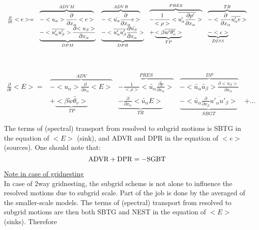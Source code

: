 \begin{displaymath}
\begin{array}{rllll}
\frac{\partial }{\partial t} <e> = & 
\overbrace{- <u_\alpha>\frac{\partial}{\partial x_\alpha} <e> }^{ADVM} &
\overbrace{- <\tilde{u_\alpha}\frac{\partial}{\partial x_\alpha} e > }^{ADVR} &
\overbrace{- \frac{1}{<\rho>}<\overline{u'_\alpha \frac{\partial p'}{\partial x_\alpha}}>}^{PRES} &
\overbrace{- <\frac{\partial}{\partial x_\alpha} \overline{u'_\alpha e}>}^{TR}\\
\vspace*{1.2cm}
&\underbrace{- <\overline{u'_\alpha u'_\beta}> \frac{\partial {<u_\beta>}}{\partial x_\alpha}}_{DPM} &
\underbrace{- <\overline{u'_\alpha u'_\beta} \frac{\partial {\tilde{u_\beta}}}{\partial x_\alpha}>}_{DPR} &
+ \underbrace{<\beta  \overline{w'\theta'_v}>}_{TP} & 
\underbrace{- <\epsilon>}_{DISS}\\
\end{array}
\end{displaymath}
\begin{displaymath}
\begin{array}{rllll}
\frac{\partial }{\partial t} <E> = & 
\overbrace{- <u_\alpha>\frac{\partial}{\partial x_\alpha} <E> }^{ADV} &
\overbrace{- \frac{1}{<\rho>}<\tilde{u_\alpha} \frac{\partial \tilde{p}}{\partial x_\alpha}>}^{PRES} &
\overbrace{- <\tilde{u_\alpha} \tilde{u_\beta}> \frac{\partial {<u_\beta>}}{\partial x_\alpha}}^{DP} &\\
&+ \underbrace{<\beta  \tilde{w}\tilde{\theta_v}>}_{TP} &
 \underbrace{- \frac{\partial}{\partial x_\alpha} <\tilde{u_\alpha} E>}_{TR} &
\underbrace{- <\tilde{u_\alpha}\frac{\partial}{\partial x_\beta}\overline{u'_\alpha u'_\beta}>}_{SBGT}  &+ \ldots
\end{array}
\end{displaymath}


The terms of (spectral) transport from resolved to subgrid motions is
SBTG in the equation of $<E>$ (sink), and
ADVR and DPR in the equation of $<e>$ (sources).
One should note that: \\

\begin{displaymath}
{\rm ADVR}+{\rm DPR} = -{\rm SGBT}
\end{displaymath}

\underline{Note in case of gridnesting}\\

In case of 2way gridnesting, the subgrid scheme is not alone to influence
the resolved motions due to subgrid scale. Part of the job is done
by the averaged of the smaller-scale models. 
The terms of (spectral) transport from resolved to subgrid motions are
then both SBTG and NEST in the equation of $<E>$ (sinks).
Therefore

